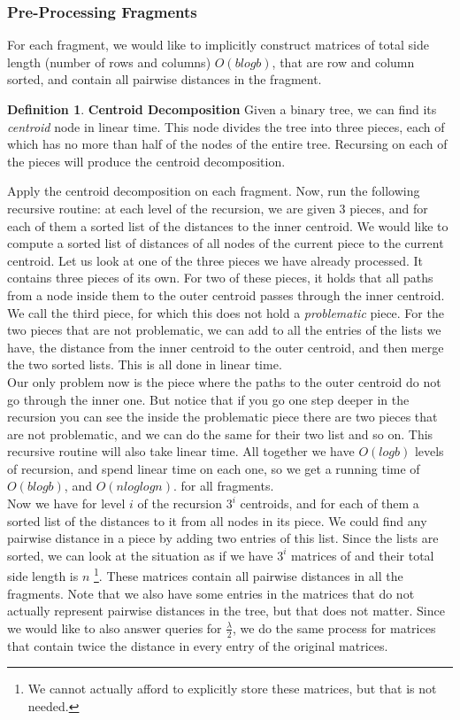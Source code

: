 \documentclass[11pt,a4paper]{article}
\theoremstyle{definition}
\newtheorem{definition}{Definition}
\theoremstyle{remark}
\begin{document}
\subsubsection{Pre-Processing Fragments}
For each fragment, we would like to implicitly construct matrices of total side length (number of rows and columns) $O(blogb)$, that are row and column sorted, and contain all pairwise distances in the fragment.

\begin{definition} \textbf{Centroid Decomposition} %
Given a binary tree, we can find its \textit{centroid} node in linear time. This node divides the tree into three pieces, each of which has no more than half of the nodes of the entire tree. Recursing on each of the pieces will produce the centroid decomposition.
\end{definition}

Apply the centroid decomposition on each fragment. Now, run the following recursive routine: at each level of the recursion, we are given 3 pieces, and for each of them a sorted list of the distances to the inner centroid. We would like to compute a sorted list of distances of all nodes of the current piece to the current centroid. Let us look at one of the three pieces we have already processed. It contains three pieces of its own. For two of these pieces, it holds that all paths from a node inside them to the outer centroid passes through the inner centroid. We call the third piece, for which this does not hold a \textit{problematic} piece. For the two pieces that are not problematic, we can add to all the entries of the lists we have, the distance from the inner centroid to the outer centroid, and then merge the two sorted lists. This is all done in linear time.\\
Our only problem now is the piece where the paths to the outer centroid do not go through the inner one. But notice that if you go one step deeper in the recursion you can see the inside the problematic piece there are two pieces that are not problematic, and we can do the same for their two list and so on. This recursive routine will also take linear time. All together we have $O(logb)$ levels of recursion, and spend linear time on each one, so we get a running time of $O(blogb)$, and $O(nloglogn)$. for all fragments.\\
Now we have for level $i$ of the recursion $3^i$ centroids, and for each of them a sorted list of the distances to it from all nodes in its piece. We could find any pairwise distance in a piece by adding two entries of this list. Since the lists are sorted, we can look at the situation as if we have $3^i$ matrices of and their total side length is $n$ \footnote{We cannot actually afford to explicitly store these matrices, but that is not needed.}. These matrices contain all pairwise distances in all the fragments. Note that we also have some entries in the matrices that do not actually represent pairwise distances in the tree, but that does not matter.
Since we would like to also answer queries for $\frac{\lambda}{2}$, we do the same process for matrices that contain twice the distance in every entry of the original matrices.\\
\end{document}
